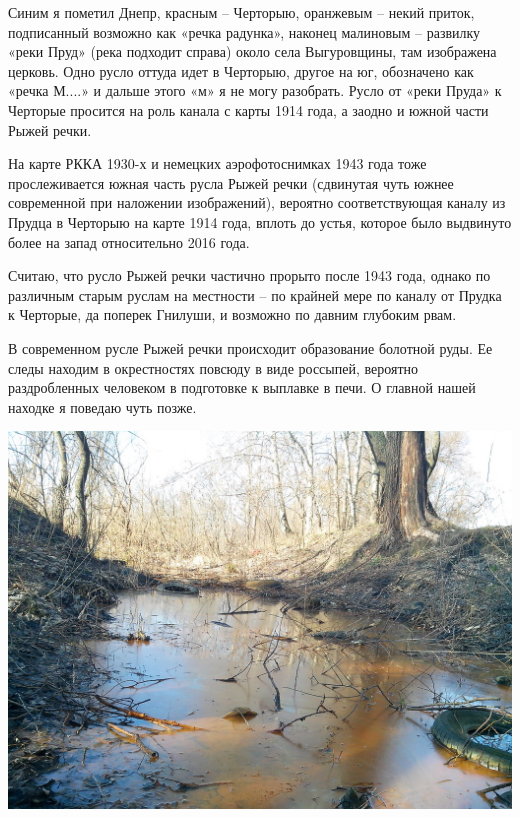 Синим я пометил Днепр, красным – Черторыю, оранжевым – некий приток, подписанный возможно как «речка радунка», наконец малиновым – развилку «реки Пруд» (река подходит справа) около села Выгуровщины, там изображена церковь. Одно русло оттуда идет в Черторыю, другое на юг, обозначено как «речка М....» и дальше этого «м» я не могу разобрать. Русло от «реки Пруда» к Черторые просится на роль канала с карты 1914 года, а заодно и южной части Рыжей речки.

На карте РККА 1930-х и немецких аэрофотоснимках 1943 года тоже прослеживается южная часть русла Рыжей речки (сдвинутая чуть южнее современной при наложении изображений), вероятно соответствующая каналу из Прудца в Черторыю на карте 1914 года, вплоть до устья, которое было выдвинуто более на запад относительно 2016 года.


Считаю, что русло Рыжей речки частично прорыто после 1943 года, однако по различным старым руслам на местности – по крайней мере по каналу от Прудка к Черторые, да поперек Гнилуши, и возможно по давним глубоким рвам.

В современном русле Рыжей речки происходит образование болотной руды. Ее следы находим в окрестностях повсюду в виде россыпей, вероятно раздробленных человеком в подготовке к выплавке в печи. О главной нашей находке я поведаю чуть позже. 
\vspace*{\fill}
\begin{center}
\includegraphics[width=\linewidth]{chast-gorodki/rud/IMG_20160316_145507.jpg}
\end{center}
\vspace*{\fill}

